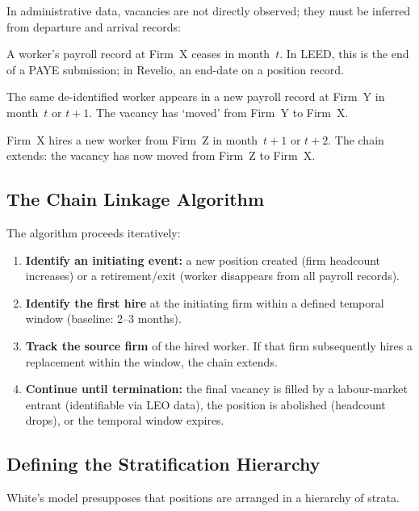 \documentclass[a4paper]{tufte-handout}
\begin{document}
In administrative data, vacancies are not directly observed; they must be inferred from departure and arrival records:

\begin{description}[style=nextline, font=\normalfont\itshape]
  \item[Departure signal]
    A worker's payroll record at Firm~X ceases in month~$t$. In LEED, this is the end of a PAYE submission; in Revelio, an end-date on a position record.
  \item[Arrival signal]
    The same de-identified worker appears in a new payroll record at Firm~Y in month~$t$ or $t{+}1$. The vacancy has `moved' from Firm~Y to Firm~X\@.
  \item[Replacement signal]
    Firm~X hires a new worker from Firm~Z in month~$t{+}1$ or $t{+}2$. The chain extends: the vacancy has now moved from Firm~Z to Firm~X\@.
\end{description}


\subsection{The Chain Linkage Algorithm}

The algorithm proceeds iteratively:

\begin{enumerate}
  \item \textbf{Identify an initiating event:} a new position created (firm headcount increases) or a retirement/exit (worker disappears from all payroll records).
  \item \textbf{Identify the first hire} at the initiating firm within a defined temporal window (baseline: 2--3 months).
  \item \textbf{Track the source firm} of the hired worker. If that firm subsequently hires a replacement within the window, the chain extends.
  \item \textbf{Continue until termination:} the final vacancy is filled by a labour-market entrant (identifiable via LEO data), the position is abolished (headcount drops), or the temporal window expires.
\end{enumerate}


\subsection{Defining the Stratification Hierarchy}

White's model presupposes that positions are arranged in a hierarchy of strata.
\end{document}
